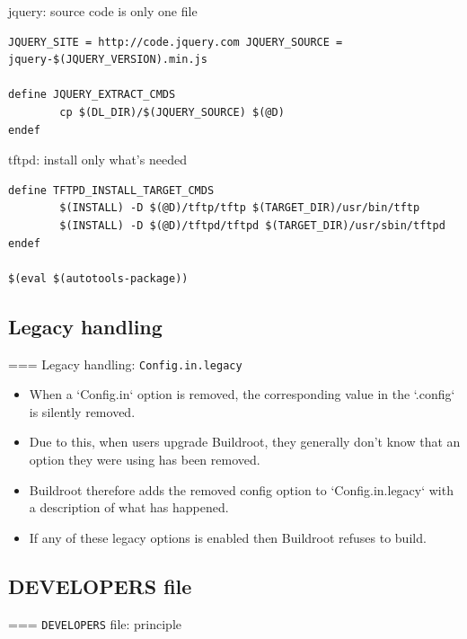 \begin{block}{jquery: source code is only one file}
\begin{verbatim}
JQUERY_SITE = http://code.jquery.com JQUERY_SOURCE = jquery-$(JQUERY_VERSION).min.js

define JQUERY_EXTRACT_CMDS
        cp $(DL_DIR)/$(JQUERY_SOURCE) $(@D)
endef
\end{verbatim}
\end{block}

\begin{block}{tftpd: install only what's needed}
\begin{verbatim}
define TFTPD_INSTALL_TARGET_CMDS
        $(INSTALL) -D $(@D)/tftp/tftp $(TARGET_DIR)/usr/bin/tftp
        $(INSTALL) -D $(@D)/tftpd/tftpd $(TARGET_DIR)/usr/sbin/tftpd endef

$(eval $(autotools-package))
\end{verbatim}
\end{block}



\subsection{Legacy handling}

=== {Legacy handling: {\tt Config.in.legacy}}
  \begin{itemize}
  \item When a `Config.in` option is removed, the corresponding
    value in the `.config` is silently removed.
  \item Due to this, when users upgrade Buildroot, they generally
    don't know that an option they were using has been removed.
  \item Buildroot therefore adds the removed config option to
    `Config.in.legacy` with a description of what has
    happened.
  \item If any of these legacy options is enabled then Buildroot
    refuses to build.
  \end{itemize}


\subsection{DEVELOPERS file}

=== {{\tt DEVELOPERS} file: principle}

